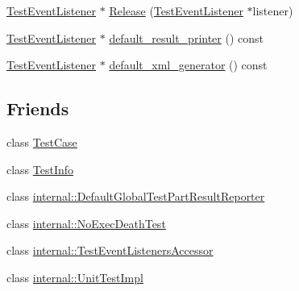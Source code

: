 \begin{DoxyCompactItemize}
\item 
\hyperlink{classtesting_1_1_test_event_listener}{Test\-Event\-Listener} $\ast$ \hyperlink{classtesting_1_1_test_event_listeners_a5d4bfb7d8584801d6074bb0ec28f8bda}{Release} (\hyperlink{classtesting_1_1_test_event_listener}{Test\-Event\-Listener} $\ast$listener)
\item 
\hyperlink{classtesting_1_1_test_event_listener}{Test\-Event\-Listener} $\ast$ \hyperlink{classtesting_1_1_test_event_listeners_a0a69b6a19e27d53d9ef4683c05e9f75a}{default\-\_\-result\-\_\-printer} () const 
\item 
\hyperlink{classtesting_1_1_test_event_listener}{Test\-Event\-Listener} $\ast$ \hyperlink{classtesting_1_1_test_event_listeners_a9867c9af50e8d2934a2475286c7cebc5}{default\-\_\-xml\-\_\-generator} () const 
\end{DoxyCompactItemize}
\subsection*{Friends}
\begin{DoxyCompactItemize}
\item 
class \hyperlink{classtesting_1_1_test_event_listeners_a61fe0349d692eb6d4f5b94e35049b2e9}{Test\-Case}
\item 
class \hyperlink{classtesting_1_1_test_event_listeners_aed3c96e2bd5a46339c1cbe49a4a233ee}{Test\-Info}
\item 
class \hyperlink{classtesting_1_1_test_event_listeners_ac731f0389a3fc3cae64a80a5e53acc2a}{internal\-::\-Default\-Global\-Test\-Part\-Result\-Reporter}
\item 
class \hyperlink{classtesting_1_1_test_event_listeners_a6a1fde70fe3144b5b2b8f68a131a171f}{internal\-::\-No\-Exec\-Death\-Test}
\item 
class \hyperlink{classtesting_1_1_test_event_listeners_aab870c143f007b57c30389c7d5a84ea3}{internal\-::\-Test\-Event\-Listeners\-Accessor}
\item 
class \hyperlink{classtesting_1_1_test_event_listeners_aa684cc13a8f91b00c0c9ce41ec7474eb}{internal\-::\-Unit\-Test\-Impl}
\end{DoxyCompactItemize}



